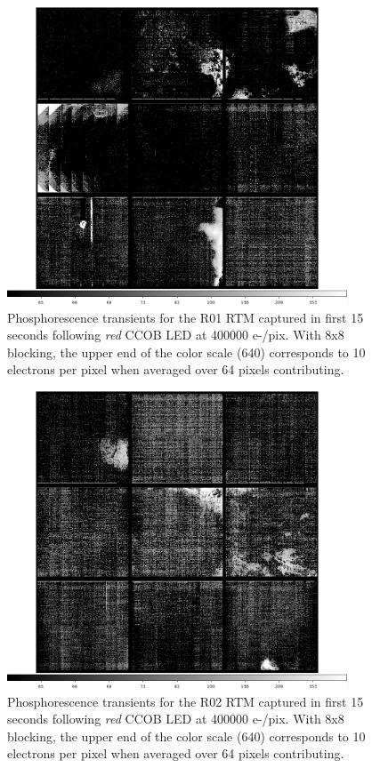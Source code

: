 \begin{figure}[!htbp]
\centering
\includegraphics[width=0.9\textwidth]{sections/figures/phosphorescence-survey/itl_fluor_R01_0-19_rb1_log.png}
\caption{Phosphorescence transients for the R01 RTM captured in first 15 seconds following {\it red} CCOB LED at 400000 e-/pix. With 8x8 blocking, the upper end of the color scale (640) corresponds to 10 electrons per pixel when averaged over 64 pixels contributing.}
\label{fig:phos:R01}
\end{figure}

\begin{figure}[!htbp]
\centering
\includegraphics[width=0.9\textwidth]{sections/figures/phosphorescence-survey/itl_fluor_R02_0-19_rb1_log.png}
\caption{Phosphorescence transients for the R02 RTM captured in first 15 seconds following {\it red} CCOB LED at 400000 e-/pix. With 8x8 blocking, the upper end of the color scale (640) corresponds to 10 electrons per pixel when averaged over 64 pixels contributing.}
\label{fig:phos:R02}
\end{figure}

